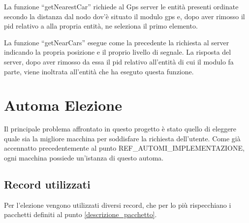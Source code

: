 La funzione ``getNearestCar'' richiede al Gps server le entità presenti ordinate secondo la distanza dal nodo dov'è situato il modulo gps e, dopo aver rimosso il pid relativo a alla propria entità, ne seleziona il primo elemento. 

La funzione ``getNearCars'' esegue come la precedente la richiesta al server indicando la propria posizione e il proprio livello di segnale. La risposta del server, dopo aver rimosso da essa il pid relativo all'entità di cui il modulo fa parte, viene inoltrata all'entità che ha eseguto questa funzione.

\section{Automa Elezione}
Il principale problema affrontato in questo progetto è stato quello di eleggere quale sia la migliore macchina per soddisfare la richiesta dell'utente. Come già accennatto precedentemente al punto REF\_AUTOMI\_IMPLEMENTAZIONE, ogni macchina possiede un'istanza di questo automa.

\subsection{Record utilizzati}\label{record_elezione}
Per l'elezione vengono utilizzati diversi record, che per lo più rispecchiano i pacchetti definiti al punto \ref{descrizione_pacchetto}.

